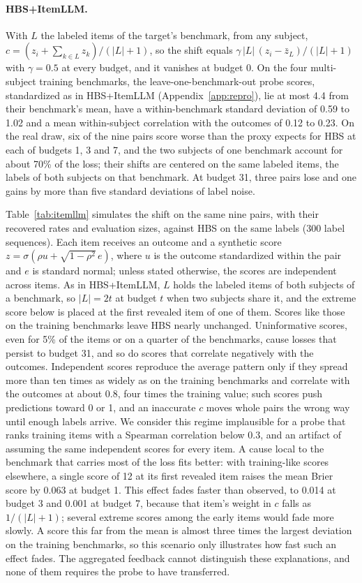 \documentclass{article}
\begin{document}
\paragraph{HBS+ItemLLM.} With $L$ the labeled items of the target's benchmark, from any subject, $c = (z_i + \sum_{k \in L} z_k) / (|L| + 1)$, so the shift equals $\gamma\, |L|\, (z_i - \bar z_L) / (|L| + 1)$ with $\gamma = 0.5$ at every budget, and it vanishes at budget 0. On the four multi-subject training benchmarks, the leave-one-benchmark-out probe scores, standardized as in HBS+ItemLLM (Appendix~\ref{app:repro}), lie at most 4.4 from their benchmark's mean, have a within-benchmark standard deviation of 0.59 to 1.02 and a mean within-subject correlation with the outcomes of 0.12 to 0.23. On the real draw, six of the nine pairs score worse than the proxy expects for HBS at each of budgets 1, 3 and 7, and the two subjects of one benchmark account for about 70\% of the loss; their shifts are centered on the same labeled items, the labels of both subjects on that benchmark. At budget 31, three pairs lose and one gains by more than five standard deviations of label noise.

Table~\ref{tab:itemllm} simulates the shift on the same nine pairs, with their recovered rates and evaluation sizes, against HBS on the same labels (300 label sequences). Each item receives an outcome and a synthetic score $z = \sigma(\rho u + \sqrt{1 - \rho^2}\, e)$, where $u$ is the outcome standardized within the pair and $e$ is standard normal; unless stated otherwise, the scores are independent across items. As in HBS+ItemLLM, $L$ holds the labeled items of both subjects of a benchmark, so $|L| = 2t$ at budget $t$ when two subjects share it, and the extreme score below is placed at the first revealed item of one of them. Scores like those on the training benchmarks leave HBS nearly unchanged. Uninformative scores, even for 5\% of the items or on a quarter of the benchmarks, cause losses that persist to budget 31, and so do scores that correlate negatively with the outcomes. Independent scores reproduce the average pattern only if they spread more than ten times as widely as on the training benchmarks and correlate with the outcomes at about 0.8, four times the training value; such scores push predictions toward 0 or 1, and an inaccurate $c$ moves whole pairs the wrong way until enough labels arrive. We consider this regime implausible for a probe that ranks training items with a Spearman correlation below 0.3, and an artifact of assuming the same independent scores for every item. A cause local to the benchmark that carries most of the loss fits better: with training-like scores elsewhere, a single score of 12 at its first revealed item raises the mean Brier score by 0.063 at budget 1. This effect fades faster than observed, to 0.014 at budget 3 and 0.001 at budget 7, because that item's weight in $c$ falls as $1/(|L| + 1)$; several extreme scores among the early items would fade more slowly. A score this far from the mean is almost three times the largest deviation on the training benchmarks, so this scenario only illustrates how fast such an effect fades. The aggregated feedback cannot distinguish these explanations, and none of them requires the probe to have transferred.
\end{document}
